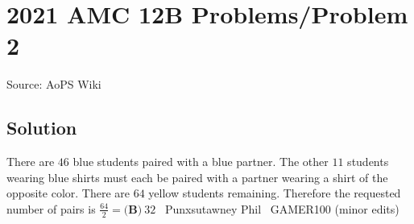 \documentclass[12pt]{article}
\begin{document}
\section*{{2021 AMC 12B Problems/Problem 2}}
Source: AoPS Wiki

\subsection*{Solution}
There are $46$ blue students paired with a blue partner. The other $11$ students wearing blue shirts must each be paired with a partner wearing a shirt of the opposite color. There are $64$ yellow students remaining. Therefore the requested number of pairs is $\tfrac{64}{2}=\boxed{\textbf{(B)} ~32}$ ~Punxsutawney Phil ~GAMER100 (minor edits)
\end{document}
